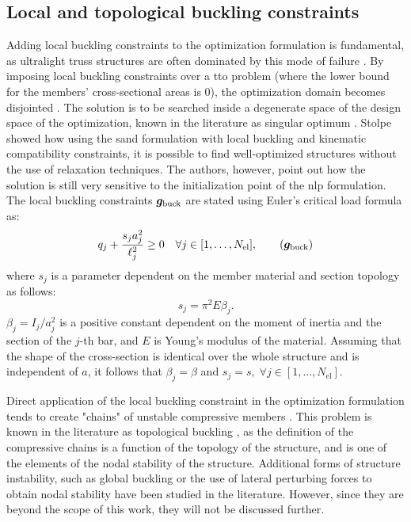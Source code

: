 \subsection{Local and topological buckling constraints}
Adding local buckling constraints to the optimization formulation is fundamental, as ultralight truss structures are often dominated by this mode of failure . By imposing local buckling constraints over a \gls{tto} problem (where the lower bound for the members' cross-sectional areas is 0), the optimization domain becomes disjointed . The solution is to be searched inside a degenerate space of the design space of the optimization, known in the literature as singular optimum . Stolpe  showed how using the \gls{sand} formulation with local buckling and kinematic compatibility constraints, it is possible to find well-optimized structures without the use of relaxation techniques. The authors, however, point out how the solution is still very sensitive to the initialization point of the \gls{nlp} formulation. The local buckling constraints $\bm{g}_{\text{buck}}$ are stated using Euler's critical load formula as:
\begin{equation}
    q_j  + \frac{s_j a_j^2}{\ell_j^2} \geq 0 \quad \forall j \in [1,\ldots, N_{\text{el}}],
    \tag{$\vect{g}_{\text{buck}}$}
    \label{eq:buck}
\end{equation}
where $s_j$ is a parameter dependent on the member material and section topology as follows:
\begin{equation}
    s_j=\pi^2 E \beta_j.
    \label{eq:s}
\end{equation}
$\beta_j=I_j/a^2_j$ is a positive constant dependent on the moment of inertia and the section of the $j$-th bar, and $E$ is Young's modulus of the material. Assuming that the shape of the cross-section is identical over the whole structure and is independent of $a$, it follows that  $\beta_j = \beta$ and $s_j = s, \; \forall j \in [1,\ldots, N_{\text{el}}]$.

Direct application of the local buckling constraint  in the optimization formulation tends to create "chains" of unstable compressive members . This problem is known in the literature as topological buckling , as the definition of the compressive chains is a function of the topology of the structure, and is one of the elements of the nodal stability of the structure. Additional forms of structure instability, such as global buckling  or the use of lateral perturbing forces to obtain nodal stability  have been studied in the literature. However, since they are beyond the scope of this work, they will not be discussed further.

